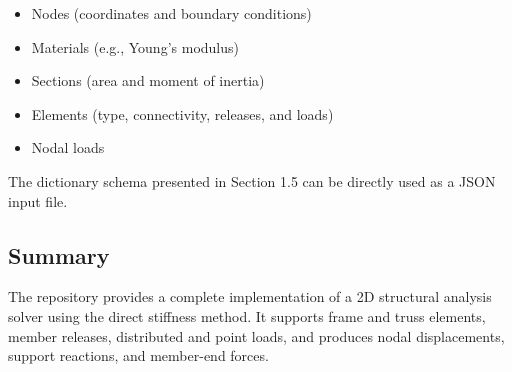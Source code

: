\begin{itemize}
  \item Nodes (coordinates and boundary conditions)
  \item Materials (e.g., Young's modulus)
  \item Sections (area and moment of inertia)
  \item Elements (type, connectivity, releases, and loads)
  \item Nodal loads
\end{itemize}

The dictionary schema presented in Section 1.5 can be directly used as a JSON input file.

\subsection*{Summary}
The repository provides a complete implementation of a 2D structural analysis solver using the direct stiffness method. It supports frame and truss elements, member releases, distributed and point loads, and produces nodal displacements, support reactions, and member-end forces.
